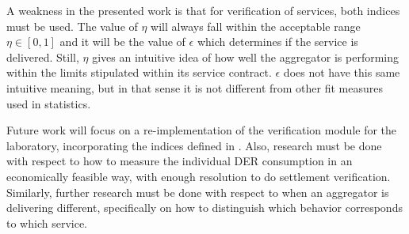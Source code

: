 A weakness in the presented work is that for verification of services, both indices must be used. The value of $\eta$ will always fall within the acceptable range $\eta \in [0,1]$ and it will be the value of $\epsilon$ which determines if the service is delivered. Still, $\eta$ gives an intuitive idea of how well the aggregator is performing within the limits stipulated within its service contract. $\epsilon$ does not have this same intuitive meaning, but in that sense it is not different from other fit measures used in statistics.

Future work will focus on a re-implementation of the verification module for the laboratory, incorporating the indices defined in \cite{bondy2016method}. Also, research must be done with respect to how to measure the individual DER consumption in an economically feasible way, with enough resolution to do settlement verification. Similarly, further research must be done with respect to when an aggregator is delivering different, specifically on how to distinguish which behavior corresponds to which service.

